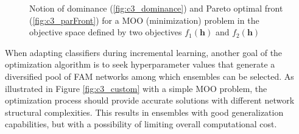 \begin{figure*}[t]
  \centering
  \caption{Notion of dominance (\ref{fig:c3_dominance}) and Pareto optimal front (\ref{fig:c3_parFront}) for a MOO (minimization) problem in the objective space defined by two objectives $f_1(\mathbf{h})$ and $f_2(\mathbf{h})$}
	\label{fig:c3_pareto}
\end{figure*}

When adapting classifiers during incremental learning, another goal of the optimization algorithm is to seek hyperparameter values that generate a diversified pool of FAM networks among which ensembles can be selected.
As illustrated in Figure \ref{fig:c3_custom} with a simple MOO problem, the optimization process should provide accurate solutions with different network structural complexities.
This results in ensembles with good generalization capabilities, but with a possibility of limiting overall computational cost.

